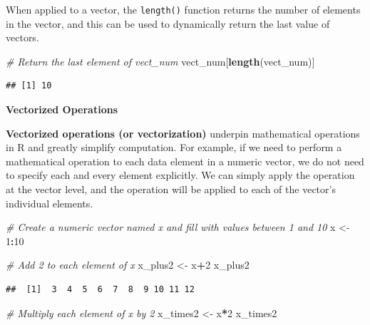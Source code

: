 \documentclass[]{book}
\newenvironment{Shaded}{\begin{snugshade}}{\end{snugshade}}
\newcommand{\CommentTok}[1]{\textcolor[rgb]{0.56,0.35,0.01}{\textit{#1}}}
\newcommand{\DecValTok}[1]{\textcolor[rgb]{0.00,0.00,0.81}{#1}}
\newcommand{\KeywordTok}[1]{\textcolor[rgb]{0.13,0.29,0.53}{\textbf{#1}}}
\newcommand{\NormalTok}[1]{#1}
\newcommand{\OperatorTok}[1]{\textcolor[rgb]{0.81,0.36,0.00}{\textbf{#1}}}
\newcommand{\StringTok}[1]{\textcolor[rgb]{0.31,0.60,0.02}{#1}}
\begin{document}
When applied to a vector, the \texttt{length()} function returns the number of elements in the vector, and this can be used to dynamically return the last value of vectors.

\begin{Shaded}
\begin{Highlighting}[]
\CommentTok{# Return the last element of vect_num}
\NormalTok{vect_num[}\KeywordTok{length}\NormalTok{(vect_num)]}
\end{Highlighting}
\end{Shaded}

\begin{verbatim}
## [1] 10
\end{verbatim}

\textbf{Vectorized Operations}

\textbf{Vectorized operations (or vectorization)} underpin mathematical operations in R and greatly simplify computation. For example, if we need to perform a mathematical operation to each data element in a numeric vector, we do not need to specify each and every element explicitly. We can simply apply the operation at the vector level, and the operation will be applied to each of the vector's individual elements.

\begin{Shaded}
\begin{Highlighting}[]
\CommentTok{# Create a numeric vector named x and fill with values between 1 and 10}
\NormalTok{x <-}\StringTok{ }\DecValTok{1}\OperatorTok{:}\DecValTok{10}
\end{Highlighting}
\end{Shaded}

\begin{Shaded}
\begin{Highlighting}[]
\CommentTok{# Add 2 to each element of x}
\NormalTok{x_plus2 <-}\StringTok{ }\NormalTok{x}\OperatorTok{+}\DecValTok{2}
\NormalTok{x_plus2}
\end{Highlighting}
\end{Shaded}

\begin{verbatim}
##  [1]  3  4  5  6  7  8  9 10 11 12
\end{verbatim}

\begin{Shaded}
\begin{Highlighting}[]
\CommentTok{# Multiply each element of x by 2}
\NormalTok{x_times2 <-}\StringTok{ }\NormalTok{x}\OperatorTok{*}\DecValTok{2}
\NormalTok{x_times2}
\end{Highlighting}
\end{Shaded}
\end{document}
